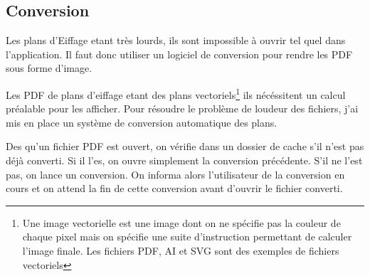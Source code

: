 \subsection{Conversion}
\label{eiffageTablePlanConversion}

Les plans d'Eiffage etant très lourds, ils sont impossible à ouvrir tel quel dans l'application.
Il faut donc utiliser un logiciel de conversion pour rendre les PDF sous forme d'image.

Les PDF de plans d'eiffage etant des plans vectoriels\footnote{Une image vectorielle est une image dont on ne spécifie pas la couleur de chaque pixel mais on spécifie une suite d'instruction permettant de calculer l'image finale. Les fichiers PDF, AI et SVG sont des exemples de fichiers vectoriels} ils nécéssitent un calcul préalable pour les afficher.
Pour résoudre le problème de loudeur des fichiers, j'ai mis en place un système de conversion automatique des plans.

\bigskip

Des qu'un fichier PDF est ouvert, on vérifie dans un dossier de cache s'il n'est pas déjà converti.
Si il l'es, on ouvre simplement la conversion précédente.
S'il ne l'est pas, on lance un conversion.
On informa alors l'utilisateur de la conversion en cours et on attend la fin de cette conversion avant d'ouvrir le fichier converti.

